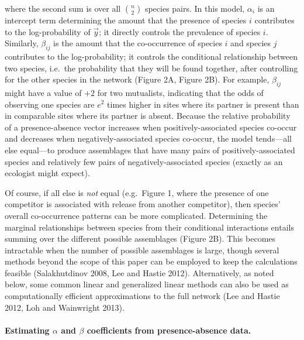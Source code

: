\documentclass[12pt,]{article}
\begin{document}
\begin{spacing}{1.9}
\begin{flushleft}
\noindent where the second sum is over all \(\binom{n}{2}\) species
pairs. In this model, \(\alpha_{i}\) is an intercept term determining
the amount that the presence of species \(i\) contributes to the
log-probability of \(\vec{y}\); it directly controls the prevalence of
species \(i\). Similarly, \(\beta_{ij}\) is the amount that the
co-occurrence of species \(i\) and species \(j\) contributes to the
log-probability; it controls the conditional relationship between two
species, i.e.~the probability that they will be found together, after
controlling for the other species in the network (Figure 2A, Figure 2B).
For example, \(\beta_{ij}\) might have a value of \(+2\) for two
mutualists, indicating that the odds of observing one species are
\(e^2\) times higher in sites where its partner is present than in
comparable sites where its partner is absent. Because the relative
probability of a presence-absence vector increases when
positively-associated species co-occur and decreases when
negatively-associated species co-occur, the model tends---all else
equal---to produce assemblages that have many pairs of
positively-associated species and relatively few pairs of
negatively-associated species (exactly as an ecologist might expect).

Of course, if all else is \emph{not} equal (e.g.~Figure 1, where the
presence of one competitor is associated with release from another
competitor), then species' overall co-occurrence patterns can be more
complicated. Determining the marginal relationships between species from
their conditional interactions entails summing over the different
possible assemblages (Figure 2B). This becomes intractable when the
number of possible assemblages is large, though several methods beyond
the scope of this paper can be employed to keep the calculations
feasible (Salakhutdinov 2008, Lee and Hastie 2012). Alternatively, as
noted below, some common linear and generalized linear methods can also
be used as computationally efficient approximations to the full network
(Lee and Hastie 2012, Loh and Wainwright 2013).

\paragraph{\texorpdfstring{Estimating \(\alpha\) and \(\beta\)
coefficients from presence-absence
data.}{Estimating \textbackslash{}alpha and \textbackslash{}beta coefficients from presence-absence data.}}\label{estimating-alpha-and-beta-coefficients-from-presence-absence-data.}


\end{flushleft}
\end{spacing}
\end{document}
